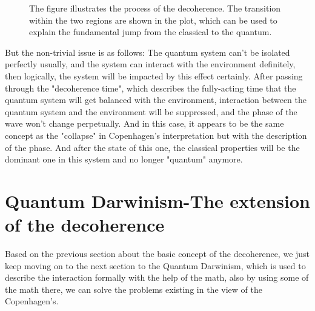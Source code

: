 \documentclass[final,1p,12pt]{elsarticle}
\begin{document}
\begin{figure}
\begin{center}
\end{center}
\caption{The figure illustrates the process of the decoherence. The transition within the two regions are shown in the plot, which can be used to explain the fundamental jump from the classical to the quantum. }
\label{9999}
\end{figure}

But the non-trivial issue is as follows: The quantum system can't be isolated perfectly usually, and the system can interact with the environment definitely, then logically, the system will be impacted by this effect certainly. After passing through the "decoherence time", which describes the fully-acting time that the quantum system will get balanced with the environment, interaction between the quantum system and the environment will be suppressed, and the phase of the wave won't change perpetually. And in this case, it appears to be the same concept as the "collapse" in Copenhagen's interpretation but with the description of the phase. And after the state of this one, the classical properties will be the dominant one in this system and no longer "quantum" anymore.\\

\section{Quantum Darwinism-The extension of the decoherence}
Based on the previous section about the basic concept of the decoherence, we just keep moving on to the next section to the Quantum Darwinism, which is used to describe the interaction formally with the help of the math, also by using some of the math there, we can solve the problems existing in the view of the Copenhagen's.\\
 
\end{document}
